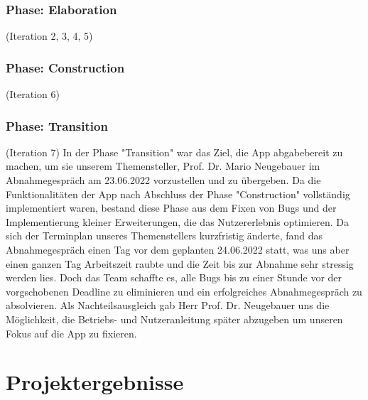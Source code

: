 \documentclass[10pt]{article}
\begin{document}
\subsubsection{Phase: Elaboration}
(Iteration 2, 3, 4, 5)
\subsubsection{Phase: Construction}
(Iteration 6)
\subsubsection{Phase: Transition}
(Iteration 7)
In der Phase "Transition" war das Ziel, die App abgabebereit zu machen, um sie unserem Themensteller, Prof. Dr. Mario Neugebauer im Abnahmegespräch am 23.06.2022 vorzustellen
und zu übergeben. Da die Funktionalitäten der App nach Abschluss der Phase "Construction" vollständig implementiert waren, bestand diese Phase aus dem Fixen von Bugs und der 
Implementierung kleiner Erweiterungen, die das Nutzererlebnis optimieren. Da sich der Terminplan unseres Themenstellers kurzfristig änderte, fand das Abnahmegespräch einen Tag
vor dem geplanten 24.06.2022 statt, was uns aber einen ganzen Tag Arbeitszeit raubte und die Zeit bis zur Abnahme sehr stressig werden lies. Doch das Team schaffte es, alle Bugs
bis zu einer Stunde vor der vorgschobenen Deadline zu eliminieren und ein erfolgreiches Abnahmegespräch zu absolvieren. Als Nachteilsausgleich gab Herr Prof. Dr. Neugebauer uns
die Möglichkeit, die Betriebs- und Nutzeranleitung später abzugeben um unseren Fokus auf die App zu fixieren.

\section{Projektergebnisse}
\end{document}
